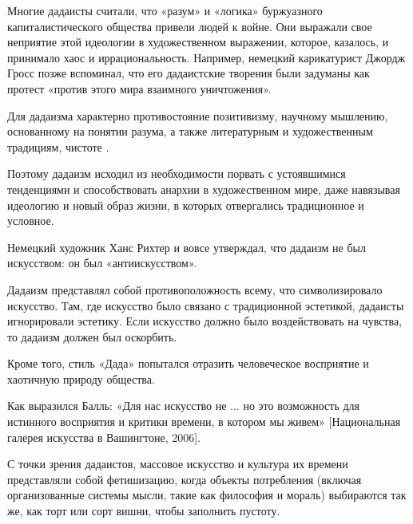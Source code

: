 Многие дадаисты считали, что «разум» и «логика» буржуазного капиталистического общества привели людей к войне. Они выражали свое неприятие этой идеологии в художественном выражении, которое, казалось,  и принимало хаос и иррациональность. Например, немецкий карикатурист Джордж Гросс позже вспоминал, что его дадаистские творения были задуманы как протест «против этого мира взаимного уничтожения».

Для дадаизма характерно противостояние позитивизму, научному мышлению, основанному на понятии разума, а также литературным и художественным традициям, чистоте .

Поэтому дадаизм исходил из необходимости порвать с устоявшимися тенденциями и способствовать анархии в художественном мире, даже навязывая идеологию и новый образ жизни, в которых отвергались традиционное и условное.

Немецкий художник Ханс Рихтер и вовсе утверждал, что дадаизм не был искусством: он был «антиискусством».

Дадаизм представлял собой противоположность всему, что символизировало искусство. Там, где искусство было связано с традиционной эстетикой, дадаисты игнорировали эстетику. Если искусство должно было воздействовать на чувства, то дадаизм должен был оскорбить.

Кроме того, стиль «Дада» попытался отразить человеческое восприятие и хаотичную природу общества.

Как выразился Балль: «Для нас искусство не ... но это возможность для истинного восприятия и критики времени, в котором мы живем» [Национальная галерея искусства в Вашингтоне, 2006].

С точки зрения дадаистов, массовое искусство и культура их времени представляли собой фетишизацию, когда объекты потребления (включая организованные системы мысли, такие как философия и мораль) выбираются так же, как торт или сорт вишни, чтобы заполнить пустоту.

